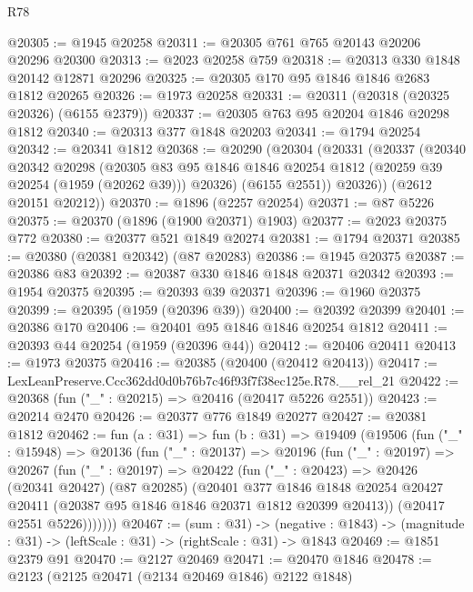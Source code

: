 \begin{lexlean}{R78}
\begin{coremodule}
@20305 := @1945 @20258
@20311 := @20305 @761 @765 @20143 @20206 @20296 @20300
@20313 := @2023 @20258 @759
@20318 := @20313 @330 @1848 @20142 @12871 @20296
@20325 := @20305 @170 @95 @1846 @1846 @2683 @1812 @20265
@20326 := @1973 @20258
@20331 := @20311 (@20318 (@20325 @20326) (@6155 @2379))
@20337 := @20305 @763 @95 @20204 @1846 @20298 @1812
@20340 := @20313 @377 @1848 @20203
@20341 := @1794 @20254
@20342 := @20341 @1812
@20368 := @20290
    (@20304
      (@20331
        (@20337
          (@20340
            @20342
            @20298
            (@20305
              @83
              @95
              @1846
              @1846
              @20254
              @1812
              (@20259 @39 @20254 (@1959 (@20262 @39)))
              @20326)
            (@6155 @2551))
          @20326))
      (@2612 @20151 @20212))
@20370 := @1896 (@2257 @20254)
@20371 := @87 @5226
@20375 := @20370 (@1896 (@1900 @20371) @1903)
@20377 := @2023 @20375 @772
@20380 := @20377 @521 @1849 @20274
@20381 := @1794 @20371
@20385 := @20380 (@20381 @20342) (@87 @20283)
@20386 := @1945 @20375
@20387 := @20386 @83
@20392 := @20387 @330 @1846 @1848 @20371 @20342
@20393 := @1954 @20375
@20395 := @20393 @39 @20371
@20396 := @1960 @20375
@20399 := @20395 (@1959 (@20396 @39))
@20400 := @20392 @20399
@20401 := @20386 @170
@20406 := @20401 @95 @1846 @1846 @20254 @1812
@20411 := @20393 @44 @20254 (@1959 (@20396 @44))
@20412 := @20406 @20411
@20413 := @1973 @20375
@20416 := @20385 (@20400 (@20412 @20413))
@20417 := LexLeanPreserve.Ccc362dd0d0b76b7c46f93f7f38ec125e.R78.__rel_21
@20422 := @20368 (fun ("_" : @20215) => @20416 (@20417 @5226 @2551))
@20423 := @20214 @2470
@20426 := @20377 @776 @1849 @20277
@20427 := @20381 @1812
@20462 := fun (a : @31) =>
  fun (b : @31) =>
  @19409
    (@19506
      (fun ("_" : @15948) =>
      @20136
        (fun ("_" : @20137) =>
        @20196
          (fun ("_" : @20197) =>
          @20267
            (fun ("_" : @20197) =>
            @20422
              (fun ("_" : @20423) =>
              @20426
                (@20341 @20427)
                (@87 @20285)
                (@20401
                  @377
                  @1846
                  @1848
                  @20254
                  @20427
                  @20411
                  (@20387 @95 @1846 @1846 @20371 @1812 @20399 @20413))
                (@20417 @2551 @5226)))))))
@20467 := (sum : @31) ->
  (negative : @1843) -> (magnitude : @31) -> (leftScale : @31) -> (rightScale : @31) -> @1843
@20469 := @1851 @2379 @91
@20470 := @2127 @20469
@20471 := @20470 @1846
@20478 := @2123 (@2125 @20471 (@2134 @20469 @1846) @2122 @1848)

\end{coremodule}
\end{lexlean}

